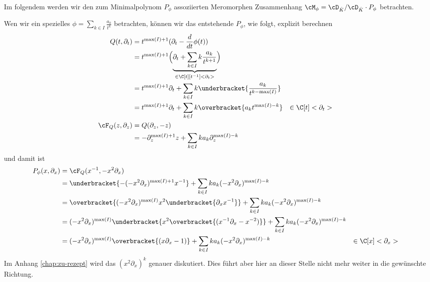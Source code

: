 Im folgendem werden wir den zum Minimalpolynom $P_\phi$ assoziierten
Meromorphen Zusammenhang $\cM_\phi=\cD_{\hat K}/\cD_{\hat K}\cdot P_{\phi}$
betrachten.

Wen wir ein spezielles $\phi=\sum_{k\in I}\frac{a_k}{t^{k}}$ betrachten, können
wir das entstehende $P_\phi$, wie folgt, explizit berechnen
\begin{align*}
Q(t,\partial_t) &= t^{\max(I)+1}(\partial_t-\frac{d}{dt}\phi(t))
\\&=t^{\max(I)+1}\Big(\underset{\in \C[t][t^{-1}]<\partial_t>}{\underbrace{
    \partial_t+\sum_{k\in I} k\frac{a_k}{t^{k+1}}}}\Big)
\\&=t^{\max(I)+1}\partial_t 
  + \sum_{k\in I} k\underbracket{\frac{a_k}{t^{k-\max(I)}}}
\\&=t^{\max(I)+1}\partial_t +\sum_{k\in I}k \overbracket{a_k t^{\max(I)-k}}
  & \in \C[t]<\partial_t>
\\\cF_Q(z,\partial_z) &=Q(\partial_z,-z)
\\&=-\partial_z^{\max(I)+1}z +\sum_{k\in I}k a_k\partial_z^{\max(I)-k}
\end{align*}
und damit ist
\begin{align*}
P_{\phi}(x,\partial_x) &=\cF_Q(x^{-1},-x^2\partial_x)
\\&=\underbracket{-(-x^2\partial_x)^{\max(I)+1}x^{-1}}
  +\sum_{k\in I}k a_k(-x^2\partial_x)^{\max(I)-k}
\\&=\overbracket{(-x^2\partial_x)^{\max(I)} x^2\underbracket{\partial_xx^{-1}}}
   +\sum_{k\in I}k a_k(-x^2\partial_x)^{\max(I)-k}
\\&=(-x^2\partial_x)^{\max(I)}
   \underbracket{ x^2 \overbracket{(x^{-1}\partial_x-x^{-2})} }
   +\sum_{k\in I}k a_k(-x^2\partial_x)^{\max(I)-k}
\\&=(-x^2\partial_x)^{\max(I)} \overbracket{(x\partial_x-1)}
   +\sum_{k\in I}k a_k(-x^2\partial_x)^{\max(I)-k}
  & \in \C[x]<\partial_x>
\end{align*}
Im Anhang \ref{chap:zu-rezept} wird das $(x^2\partial_x)^{k}$ genauer
diskutiert. Dies führt aber hier an dieser Stelle nicht mehr weiter in die
gewünschte Richtung.

